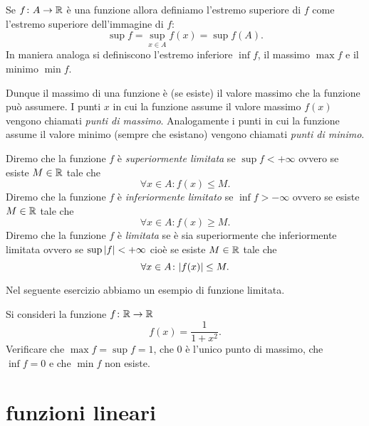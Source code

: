 \begin{definition}
\label{def:funzione_limitata}%
Se $f\colon A \to {\mathbb R}$ è una funzione allora definiamo
l'estremo superiore di $f$ come l'estremo superiore
dell'immagine di $f$:
\[
  \sup f = \sup_{x\in A} f(x) = \sup f(A).
\]
In maniera analoga si definiscono l'estremo inferiore $\inf f$,
il massimo $\max f$ e il minimo $\min f$.

Dunque il massimo di una funzione è (se esiste) il valore massimo
che la funzione può assumere. I punti $x$ in cui
la funzione assume il valore massimo $f(x)$ vengono chiamati
\emph{punti di massimo}.
%
%
%
%
Analogamente i punti in cui la funzione
assume il valore minimo (sempre che esistano) vengono
chiamati \emph{punti di minimo}.

Diremo che la funzione $f$ è
\emph{superiormente limitata}%
%
se $\sup f<+\infty$
ovvero se esiste $M\in {\mathbb R}$ tale che
\[
\forall x\in A \colon f(x) \le M.
\]
Diremo che la funzione $f$ è
\emph{inferiormente limitato}%
%
se $\inf f > -\infty$ ovvero se esiste $M\in {\mathbb R}$ tale che
\[
 \forall x \in A \colon f(x) \ge M.
\]
Diremo che la funzione $f$ è \emph{limitata}%
%
se è sia superiormente che inferiormente limitata ovvero
se $\sup{\left|f\right|}<+\infty$ cioè se esiste $M\in {\mathbb R}$ tale che
\[
\forall x \in A \colon {\left|f(x)\right|}\le M.
\]
\end{definition}

Nel seguente esercizio abbiamo un esempio di funzione limitata.
\begin{exercise}
Si consideri la funzione $f\colon {\mathbb R}\to{\mathbb R}$
\[
 f(x) = \frac{1}{1+x^2}.
\]
Verificare che $\max f = \sup f = 1$, che $0$ è l'unico punto di massimo,
che $\inf f = 0$ e che $\min f$ non esiste.
\end{exercise}

\section{funzioni lineari}

